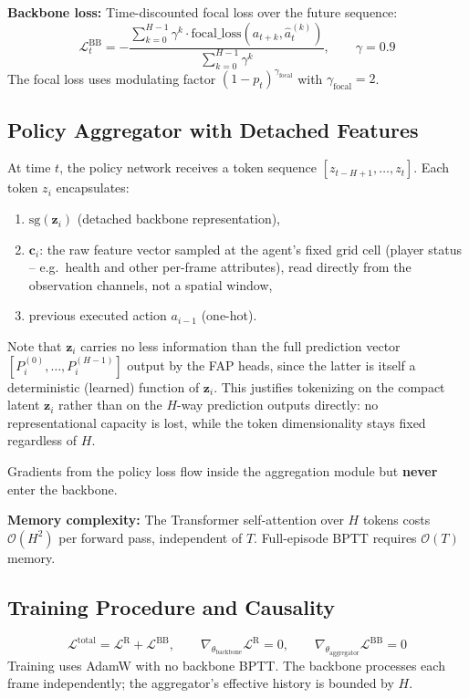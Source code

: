 \documentclass[11pt]{article}
\begin{document}
\textbf{Backbone loss:} Time-discounted focal loss over the future sequence:
\[
\mathcal{L}^{\text{BB}}_t = - \frac{\sum_{k=0}^{H-1} \gamma^k \cdot \text{focal\_loss}(a_{t+k}, \hat{a}_t^{(k)})}{\sum_{k=0}^{H-1} \gamma^k}, \qquad \gamma = 0.9
\]
The focal loss uses modulating factor \((1-p_t)^{\gamma_{\text{focal}}}\) with \(\gamma_{\text{focal}}=2\).

\subsection{Policy Aggregator with Detached Features}
At time \(t\), the policy network receives a token sequence \([z_{t-H+1}, \dots, z_t]\). Each token \(z_i\) encapsulates:
\begin{enumerate}
    \item \(\text{sg}(\mathbf{z}_i)\) (detached backbone representation),
    \item \(\mathbf{c}_i\): the raw feature vector sampled at the agent's fixed grid cell (player status – e.g.\ health and other per-frame attributes), read directly from the observation channels, not a spatial window,
    \item previous executed action \(a_{i-1}\) (one-hot).
\end{enumerate}
Note that \(\mathbf{z}_i\) carries no less information than the full prediction vector \([P_i^{(0)}, \dots, P_i^{(H-1)}]\) output by the FAP heads, since the latter is itself a deterministic (learned) function of \(\mathbf{z}_i\). This justifies tokenizing on the compact latent \(\mathbf{z}_i\) rather than on the \(H\)-way prediction outputs directly: no representational capacity is lost, while the token dimensionality stays fixed regardless of \(H\).

Gradients from the policy loss flow inside the aggregation module but \textbf{never} enter the backbone.

\textbf{Memory complexity:} The Transformer self-attention over \(H\) tokens costs \(\mathcal{O}(H^2)\) per forward pass, independent of \(T\). Full-episode BPTT requires \(\mathcal{O}(T)\) memory.

\subsection{Training Procedure and Causality}
\[
\mathcal{L}^{\text{total}} = \mathcal{L}^{\text{R}} + \mathcal{L}^{\text{BB}}, \qquad
\nabla_{\theta_{\text{backbone}}} \mathcal{L}^{\text{R}} = 0, \qquad
\nabla_{\theta_{\text{aggregator}}} \mathcal{L}^{\text{BB}} = 0
\]
Training uses AdamW with no backbone BPTT. The backbone processes each frame independently; the aggregator's effective history is bounded by \(H\).
\end{document}
